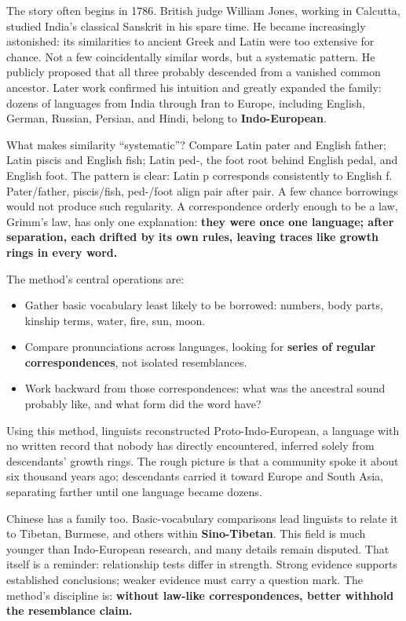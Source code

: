 The story often begins in 1786. British judge William Jones, working in Calcutta, studied India's classical Sanskrit in his spare time. He became increasingly astonished: its similarities to ancient Greek and Latin were too extensive for chance. Not a few coincidentally similar words, but a systematic pattern. He publicly proposed that all three probably descended from a vanished common ancestor. Later work confirmed his intuition and greatly expanded the family: dozens of languages from India through Iran to Europe, including English, German, Russian, Persian, and Hindi, belong to \textbf{Indo-European}.

What makes similarity ``systematic''? Compare Latin pater and English father; Latin piscis and English fish; Latin ped-, the foot root behind English pedal, and English foot. The pattern is clear: Latin p corresponds consistently to English f. Pater/father, piscis/fish, ped-/foot align pair after pair. A few chance borrowings would not produce such regularity. A correspondence orderly enough to be a law, Grimm's law, has only one explanation: \textbf{they were once one language; after separation, each drifted by its own rules, leaving traces like growth rings in every word.}

The method's central operations are:

\begin{itemize}
\item Gather basic vocabulary least likely to be borrowed: numbers, body parts, kinship terms, water, fire, sun, moon.
\item Compare pronunciations across languages, looking for \textbf{series of regular correspondences}, not isolated resemblances.
\item Work backward from those correspondences: what was the ancestral sound probably like, and what form did the word have?
\end{itemize}
Using this method, linguists reconstructed Proto-Indo-European, a language with no written record that nobody has directly encountered, inferred solely from descendants' growth rings. The rough picture is that a community spoke it about six thousand years ago; descendants carried it toward Europe and South Asia, separating farther until one language became dozens.

Chinese has a family too. Basic-vocabulary comparisons lead linguists to relate it to Tibetan, Burmese, and others within \textbf{Sino-Tibetan}. This field is much younger than Indo-European research, and many details remain disputed. That itself is a reminder: relationship tests differ in strength. Strong evidence supports established conclusions; weaker evidence must carry a question mark. The method's discipline is: \textbf{without law-like correspondences, better withhold the resemblance claim.}

